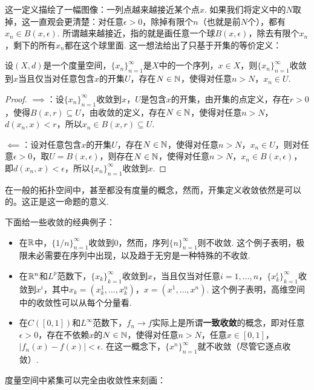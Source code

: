 这一定义描绘了一幅图像：一列点越来越接近某个点$x$. 如果我们将定义中的$N$取掉，这一直观会更清楚：对任意$\epsilon>0$，除掉有限个$n$（也就是前$N$个），都有$x_n\in B(x,\epsilon)$. 所谓越来越接近，指的就是画任意一个球$B(x,\epsilon)$，除去有限个$x_n$，剩下的所有$x_n$都在这个球里面. 这一想法给出了只基于开集的等价定义：

\begin{proposition}\label{prop:converge-ball}
    设$(X,d)$是一个度量空间，$\{x_n\}_{n=1}^\infty$是$X$中的一个序列，$x\in X$，则$\{x_n\}_{n=1}^\infty$收敛到$x$当且仅当对任意包含$x$的开集$U$，存在$N\in\mathbb{N}$，使得对任意$n>N$，$x_n\in U$.
\end{proposition}
\begin{proof}
    $\implies$：设$\{x_n\}_{n=1}^\infty$收敛到$x$，$U$是包含$x$的开集，由开集的点定义，存在$r>0$，使得$B(x,r)\subseteq U$，由收敛的定义，存在$N\in\mathbb{N}$，使得对任意$n>N$，$d(x_n,x)<r$，所以$x_n\in B(x,r)\subseteq U$.

    $\impliedby$：设对任意包含$x$的开集$U$，存在$N\in\mathbb{N}$，使得对任意$n>N$，$x_n\in U$，则对任意$\epsilon>0$，取$U=B(x,\epsilon)$，则存在$N\in\mathbb{N}$，使得对任意$n>N$，$x_n\in B(x,\epsilon)$，即$d(x_n,x)<\epsilon$，所以$\{x_n\}_{n=1}^\infty$收敛到$x$.
\end{proof}

在一般的拓扑空间中，甚至都没有度量的概念，然而，开集定义收敛依然是可以的。这正是这一命题的意义. 

下面给一些收敛的经典例子：
\begin{example}
\begin{itemize}
    \item 在$\mathbb{R}$中，$\{1/n\}_{n=1}^\infty$收敛到$0$，然而，序列$\{n\}_{n=1}^\infty$则不收敛. 这个例子表明，极限未必需要在序列中出现，以及趋于无穷是一种特殊的不收敛.
    \item 在$\mathbb{R}^n$和$L^p$范数下，$\{x_k\}_{k=1}^\infty$收敛到$x$，当且仅当对任意$i=1,\dots,n$，$\{x_k^i\}_{k=1}^\infty$收敛到$x^i$，其中$x_k=(x_k^1,\dots,x_k^n)$，$x=(x^1,\dots,x^n)$. 这个例子表明，高维空间中的收敛性可以从每个分量看. 
    \item 在$C([0,1])$和$L^\infty$范数下，$f_n\to f$实际上是所谓\textbf{一致收敛}的概念，即对任意$\epsilon>0$，存在不依赖$x$的$N\in\mathbb{N}$，使得对任意$n>N$，任意$x\in[0,1]$，$|f_n(x)-f(x)|<\epsilon$. 在这一概念下，$\{x^n\}_{n=1}^\infty$就不收敛（尽管它逐点收敛）. 
\end{itemize}
\end{example}

度量空间中紧集可以完全由收敛性来刻画：

